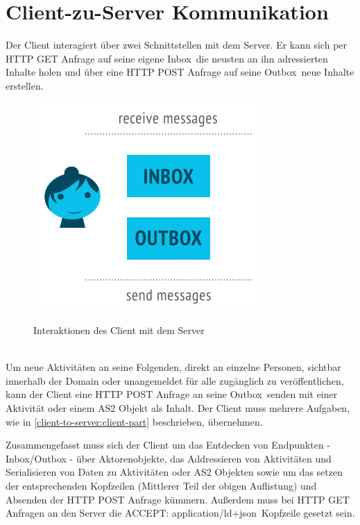 \section{Client-zu-Server Kommunikation}
	Der Client interagiert über zwei Schnittstellen mit dem Server. Er kann sich per HTTP GET Anfrage auf seine eigene \glqq Inbox\grqq~die neusten an ihn adressierten Inhalte holen und über eine HTTP POST Anfrage auf seine \glqq Outbox\grqq~neue Inhalte erstellen.
	\begin{figure}[h]
		\begin{minipage}{\textwidth}
			\centering
			\includegraphics[scale=0.6]{figures/inbox-outbox.png}
			\label{Client zu Server Interaktionen}
			\caption{Interaktionen des Client mit dem Server}
		\end{minipage}
	\end{figure}\\
	Um neue Aktivitäten an seine Folgenden, direkt an einzelne Personen, sichtbar innerhalb der Domain oder unangemeldet für alle zugänglich zu veröffentlichen, kann der Client eine HTTP POST Anfrage an seine \glqq Outbox\grqq~senden mit einer Aktivität oder einem \gls{AS2} Objekt als Inhalt. Der Client muss mehrere Aufgaben, wie in \ref{client-to-server:client-part} beschrieben, übernehmen.\\
	
	Zusammengefasst muss sich der Client um das Entdecken von Endpunkten - Inbox/Outbox - über Aktorenobjekte, das Addressieren von Aktivitäten und Serialisieren von Daten zu Aktivitäten oder \gls{AS2} Objekten sowie um das setzen der entsprechenden Kopfzeilen (Mittlerer Teil der obigen Auflistung) und Absenden der HTTP POST Anfrage kümmern. Außerdem muss bei HTTP GET Anfragen an den Server die \glqq ACCEPT: application/ld+json\grqq~Kopfzeile gesetzt sein.\\
	
